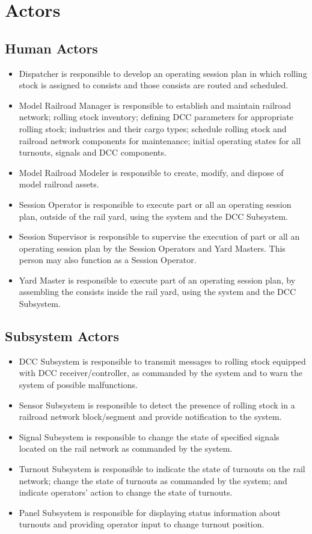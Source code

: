 \section{Actors}
\subsection{Human Actors}
\begin{itemize}
  \item Dispatcher is responsible to develop an operating session plan in which rolling stock is assigned to consists and those consists are routed and scheduled.
  \item Model Railroad Manager is responsible to establish and maintain railroad network; rolling stock inventory; defining \ac{DCC} parameters for appropriate rolling stock; industries and their cargo types; schedule rolling stock and railroad network components for maintenance; initial operating states for all turnouts, signals and \ac{DCC} components.
  \item Model Railroad Modeler is responsible to create, modify, and dispose of model railroad assets.
  \item Session Operator is responsible to execute part or all an operating session plan, outside of the rail yard, using the system and the \ac{DCC} Subsystem.
  \item Session Supervisor is responsible to supervise the execution of part or all an operating session plan by the Session Operators and Yard Masters. This person may also function as a Session Operator.
  \item Yard Master is responsible to execute part of an operating session plan, by assembling the consists inside the rail yard, using the system and the \ac{DCC} Subsystem.
\end{itemize}
\subsection{Subsystem Actors}
\begin{itemize}
  \item \ac{DCC} Subsystem is responsible to transmit messages to rolling stock equipped with \ac{DCC} receiver/controller, as commanded by the system and to warn the system of possible malfunctions.
  \item Sensor Subsystem is responsible to detect the presence of rolling stock in a railroad network block/segment and provide notification to the system.
  \item Signal Subsystem is responsible to change the state of specified signals located on the rail network as commanded by the system.
  \item Turnout Subsystem is responsible to indicate the state of turnouts on the rail network; change the state of turnouts as commanded by the system; and indicate operators’ action to change the state of turnouts.
  \item Panel Subsystem is responsible for displaying status information about turnouts and providing operator input to change turnout position.
\end{itemize}
